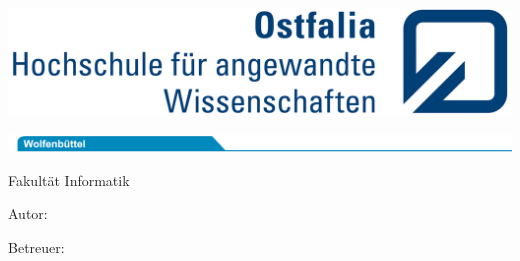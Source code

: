 \frontmatter
\begin{titlepage}
	\thispagestyle{titlepage}
	
	\hfill
	\includegraphics[scale=0.93]{Bilder/ostfalia_logo.jpg}
	
	\includegraphics[scale=1.20]{Bilder/reiter_wf_174mm.jpg}
	
	\hspace{1cm}
	\begin{minipage}{\dimexpr\textwidth-1.5cm\relax}
		{\Large\textsf{Fakultät Informatik}}
	\end{minipage}
	
	\vfil
	
	\hspace{1cm}
	\begin{minipage}{\dimexpr\textwidth-1.5cm\relax}
		\hrulefill
	
		{\Large\textbf{\textsf{\documentsubject}}}
			
		\vspace{2em}
			
		{\Huge\textbf{\textsf{\documenttitle}}}
			
		\vspace{2em}
			
		{\Large\textsf{\documentsubtitle}}
		
		\hrulefill
	\end{minipage}	
	
	
	\vfil
	
	\hspace{1cm}
	\begin{minipage}{\dimexpr\textwidth-1.5cm\relax}
		{\Large\textsf{Autor: \documentauthor}}
		
		\vspace{0.5cm}		
		
		{\Large\textsf{Betreuer: \documenttutor}}
	\end{minipage}
	

\end{titlepage}
